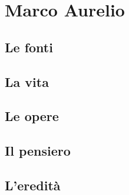 \chapter{Marco Aurelio}

\section{Le fonti}

\section{La vita}

\section{Le opere}

\section{Il pensiero}

\section{L'eredità}
